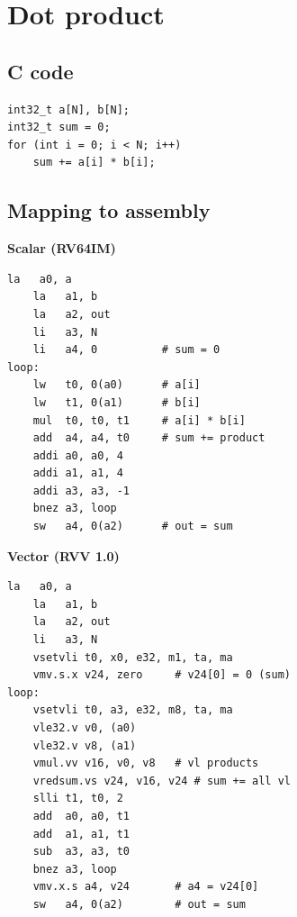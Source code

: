 \documentclass[11pt,a4paper]{article}
\begin{document}
\section{Dot product}

\subsection{C code}

\begin{lstlisting}[style=c]
int32_t a[N], b[N];
int32_t sum = 0;
for (int i = 0; i < N; i++)
    sum += a[i] * b[i];
\end{lstlisting}

\subsection{Mapping to assembly}

\begin{minipage}[t]{0.47\textwidth}
\textbf{Scalar (RV64IM)}
\begin{lstlisting}[style=asm]
    la   a0, a
    la   a1, b
    la   a2, out
    li   a3, N
    li   a4, 0          # sum = 0
loop:
    lw   t0, 0(a0)      # a[i]
    lw   t1, 0(a1)      # b[i]
    mul  t0, t0, t1     # a[i] * b[i]
    add  a4, a4, t0     # sum += product
    addi a0, a0, 4
    addi a1, a1, 4
    addi a3, a3, -1
    bnez a3, loop
    sw   a4, 0(a2)      # out = sum
\end{lstlisting}
\end{minipage}\hfill
\begin{minipage}[t]{0.50\textwidth}
\textbf{Vector (RVV 1.0)}
\begin{lstlisting}[style=asm]
    la   a0, a
    la   a1, b
    la   a2, out
    li   a3, N
    vsetvli t0, x0, e32, m1, ta, ma
    vmv.s.x v24, zero     # v24[0] = 0 (sum)
loop:
    vsetvli t0, a3, e32, m8, ta, ma
    vle32.v v0, (a0)
    vle32.v v8, (a1)
    vmul.vv v16, v0, v8   # vl products
    vredsum.vs v24, v16, v24 # sum += all vl
    slli t1, t0, 2
    add  a0, a0, t1
    add  a1, a1, t1
    sub  a3, a3, t0
    bnez a3, loop
    vmv.x.s a4, v24       # a4 = v24[0]
    sw   a4, 0(a2)        # out = sum
\end{lstlisting}
\end{minipage}
\end{document}
